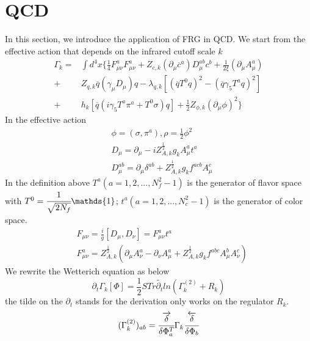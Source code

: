\documentclass[UTF8]{article}
\begin{document}
\section{QCD}
In this section, we introduce the application of FRG in QCD. We start from the effective action that depends on the infrared cutoff scale $k$
\begin{equation}
\begin{split}
\Gamma_k=&\int d^4x\{ \frac{1}{4}F^{a}_{\mu\nu}F^{a}_{\mu\nu}+Z_{c,k}(\partial_\mu\overline c^a)D^{ab}_{\mu}c^b+\frac{1}{2\xi}(\partial_\mu A^{a}_{\mu})\\
+&Z_{q,k}\overline q(\gamma_\mu D_\mu)q-\lambda_{q,k}[(\overline qT^0q)^2-(\overline q\gamma_5T^aq)^2]\\
+&h_k[\overline q(i\gamma_5T^a\pi^a+T^0\sigma)q]+\frac{1}{2}Z_{\phi,k}(\partial_\mu\phi)^2 \}
\end{split}
\end{equation}
In the effective action 
\begin{equation}
\begin{split}
&\phi=(\sigma,\pi^a) , \rho=\frac{1}{2}\phi^2\\
&D_\mu=\partial_\mu-iZ^{\frac{1}{2}}_{A,k}g_kA^{a}_{\mu}t^a\\
&D^{ab}_{\mu}=\partial_\mu\delta^{ab}+Z^{\frac{1}{2}}_{A,k}g_kf^{acb}A^{c}_{\mu}
\end{split}
\end{equation}
In the definition above $T^a (a=1,2,...,N_f^2-1)$ is the generator of flavor space with $T^0=\cfrac{1}{\sqrt{2N_f}} \mathds{1}$; $t^a(a=1,2,...,N_c^2-1)$ is the generator of color space.
\begin{equation}
\begin{split}
&F_{\mu\nu}=\frac{i}{g}[D_\mu,D_\nu]=F^{a}_{\mu\nu}t^a\\
&F^{a}_{\mu\nu}=Z^{\frac{1}{2}}_{A,k} (\partial_\mu A^{a}_{\nu}-\partial_\nu A^{a}_{\mu}+Z^{\frac{1}{2}}_{A,k} g_k f^{abc}A^b_\mu A^c_\nu)
\end{split}
\end{equation}
We rewrite the Wetterich equation as below
\begin{equation}\label{weq2}
\partial_t\Gamma_k[\Phi]=\frac{1}{2}STr{\widetilde{\partial_t}ln(\Gamma^{(2)}_{k}+R_k)}
\end{equation}
the tilde on the $\partial_t$ stands for the derivation only works on the regulator $R_k$.
\begin{equation}
(\Gamma^{(2)}_{k})_{ab}=\cfrac{\overrightarrow{\delta}}{\delta\Phi^{T}_{a}}\Gamma_k\cfrac{\overleftarrow{\delta}}{\delta\Phi_{b}}
\end{equation}
\end{document}
